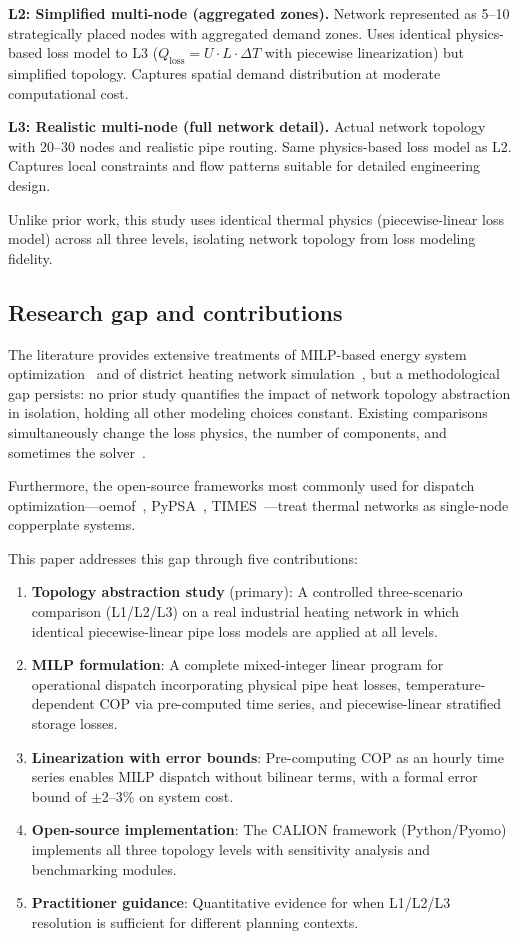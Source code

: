 \documentclass[a4paper,fleqn]{cas-dc}
\begin{document}
\textbf{L2: Simplified multi-node (aggregated zones).} Network represented as 5--10 strategically placed nodes with aggregated demand zones. Uses identical physics-based loss model to L3 ($Q_\mathrm{loss} = U \cdot L \cdot \Delta T$ with piecewise linearization) but simplified topology. Captures spatial demand distribution at moderate computational cost.

\textbf{L3: Realistic multi-node (full network detail).} Actual network topology with 20--30 nodes and realistic pipe routing. Same physics-based loss model as L2. Captures local constraints and flow patterns suitable for detailed engineering design.

Unlike prior work, this study uses identical thermal physics (piecewise-linear loss model) across all three levels, isolating network topology from loss modeling fidelity.

\subsection{Research gap and contributions}

The literature provides extensive treatments of MILP-based energy system optimization~\citep{Lund2009,Bloess2018,Robinius2017} and of district heating network simulation~\citep{Benonysson1995,Frederiksen2013,Moller2017}, but a methodological gap persists: no prior study quantifies the impact of network topology abstraction in isolation, holding all other modeling choices constant. Existing comparisons simultaneously change the loss physics, the number of components, and sometimes the solver~\citep{Moser2019,Wang2020,Volkova2019,Leitner2018}.

Furthermore, the open-source frameworks most commonly used for dispatch optimization---oemof~\citep{Hilpert2018}, PyPSA~\citep{Brown2018}, TIMES~\citep{Loulou2005}---treat thermal networks as single-node copperplate systems.

This paper addresses this gap through five contributions:
\begin{enumerate}
\item \textbf{Topology abstraction study} (primary): A controlled three-scenario comparison (L1/L2/L3) on a real industrial heating network in which identical piecewise-linear pipe loss models are applied at all levels.
\item \textbf{MILP formulation}: A complete mixed-integer linear program for operational dispatch incorporating physical pipe heat losses, temperature-dependent COP via pre-computed time series, and piecewise-linear stratified storage losses.
\item \textbf{Linearization with error bounds}: Pre-computing COP as an hourly time series enables MILP dispatch without bilinear terms, with a formal error bound of $\pm$2--3\% on system cost.
\item \textbf{Open-source implementation}: The CALION framework (Python/Pyomo) implements all three topology levels with sensitivity analysis and benchmarking modules.
\item \textbf{Practitioner guidance}: Quantitative evidence for when L1/L2/L3 resolution is sufficient for different planning contexts.
\end{enumerate}
\end{document}
